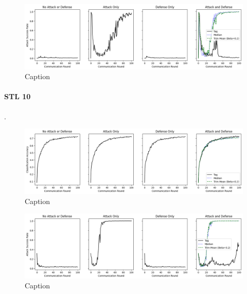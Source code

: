 \documentclass{article} %
\begin{document}
\begin{figure}[H]
    \centering
    \includegraphics[width=\textwidth]{cifar_100/neuro/tag/distributed/alpha10000--alpha_val10000/visuals/pois_accuracy--n_malicious4--beta0.2.png}
    \caption{Caption}
    \label{fig:my_label}
\end{figure}


%
\paragraph{STL 10}.

\begin{figure}[H]
    \centering
    \includegraphics[width=\textwidth]{stl_10/neuro/tag/distributed/alpha10000--alpha_val10000/visuals/clean_accuracy--n_malicious4--beta0.2.png}
    \caption{Caption}
    \label{fig:my_label}
\end{figure}

\begin{figure}[H]
    \centering
    \includegraphics[width=\textwidth]{stl_10/neuro/tag/distributed/alpha10000--alpha_val10000/visuals/pois_accuracy--n_malicious4--beta0.2.png}
    \caption{Caption}
    \label{fig:my_label}
\end{figure}
\end{document}
